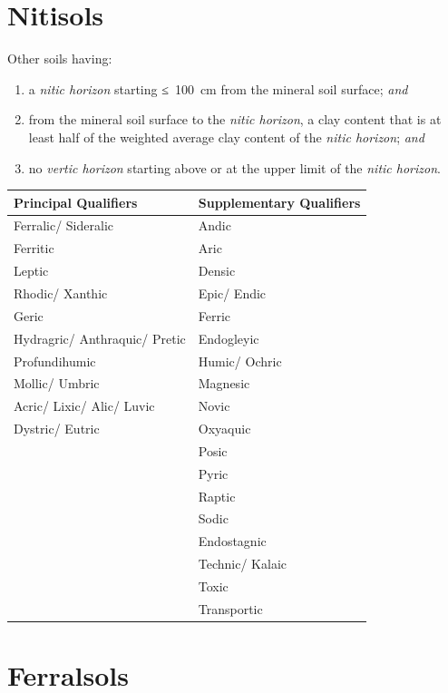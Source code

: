 \documentclass[
  letterpaper,
  DIV=11,
  numbers=noendperiod]{scrreprt}
\providecommand{\tightlist}{%
  \setlength{\itemsep}{0pt}\setlength{\parskip}{0pt}}\usepackage{longtable,booktabs,array}
\begin{document}

\hypertarget{key-nitisols}{%
\chapter{Nitisols}\label{key-nitisols}}

Other soils having:

\begin{enumerate}
\def\labelenumi{\arabic{enumi}.}
\tightlist
\item
  a \emph{nitic horizon} starting ≤~100~cm from the mineral soil
  surface; \emph{and}
\item
  from the mineral soil surface to the \emph{nitic horizon}, a clay
  content that is at least half of the weighted average clay content of
  the \emph{nitic horizon}; \emph{and}
\item
  no \emph{vertic horizon} starting above or at the upper limit of the
  \emph{nitic horizon}.
\end{enumerate}

\begin{longtable}[]{@{}ll@{}}
\toprule()
Principal Qualifiers & Supplementary Qualifiers \\
\midrule()
\endhead
Ferralic/ Sideralic & Andic \\
Ferritic & Aric \\
Leptic & Densic \\
Rhodic/ Xanthic & Epic/ Endic \\
Geric & Ferric \\
Hydragric/ Anthraquic/ Pretic & Endogleyic \\
Profundihumic & Humic/ Ochric \\
Mollic/ Umbric & Magnesic \\
Acric/ Lixic/ Alic/ Luvic & Novic \\
Dystric/ Eutric & Oxyaquic \\
& Posic \\
& Pyric \\
& Raptic \\
& Sodic \\
& Endostagnic \\
& Technic/ Kalaic \\
& Toxic \\
& Transportic \\
\bottomrule()
\end{longtable}


\hypertarget{key-ferralsols}{%
\chapter{Ferralsols}\label{key-ferralsols}}
\end{document}
